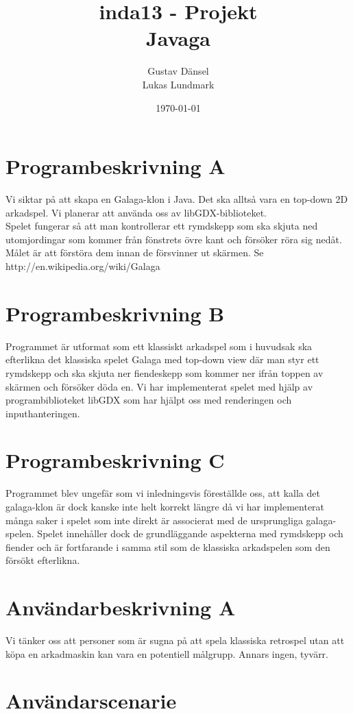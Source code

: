 \documentclass[a4paper,11pt]{article}
\title{inda13 - Projekt \\
		Javaga}
\author{Gustav Dänsel \\ Lukas Lundmark }
\date{\today}
\begin{document}
\maketitle
\section{Programbeskrivning A}
Vi siktar på att skapa en Galaga-klon i Java. Det ska alltså vara en top-down 2D arkadspel. Vi planerar att använda oss av libGDX-biblioteket. \\

Spelet fungerar så att man kontrollerar ett rymdskepp som ska skjuta ned utomjordingar som kommer från fönstrets övre kant och försöker röra sig nedåt. Målet är att förstöra dem innan de försvinner ut skärmen. Se http://en.wikipedia.org/wiki/Galaga

\section{Programbeskrivning B}
Programmet är utformat som ett klassiskt arkadspel som i huvudsak ska efterlikna det klassiska spelet Galaga med top-down view där man styr ett rymdskepp och ska skjuta ner fiendeskepp som kommer ner ifrån toppen av skärmen och försöker döda en. Vi har implementerat spelet med hjälp av programbiblioteket libGDX som har hjälpt oss med renderingen och inputhanteringen.

\section{Programbeskrivning C}
Programmet blev ungefär som vi inledningsvis föreställde oss, att kalla det galaga-klon är dock kanske inte helt korrekt längre då vi har implementerat många saker i spelet som inte direkt är associerat med de ursprungliga galaga-spelen. Spelet innehåller dock de grundläggande aspekterna med rymdskepp och fiender och är fortfarande i samma stil som de klassiska arkadspelen som den försökt efterlikna.

\section{Användarbeskrivning A}
Vi tänker oss att personer som är sugna på att spela klassiska retrospel utan att köpa en arkadmaskin kan vara en potentiell målgrupp. Annars ingen, tyvärr.

\section{Användarscenarie}
\end{document}
